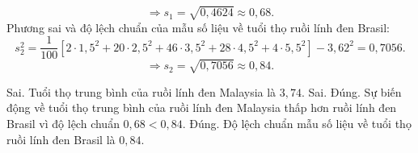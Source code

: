 \begin{ex}
{		$$\Rightarrow s_1 = \sqrt{0{,}4624} \approx 0{,}68.$$
		Phương sai và độ lệch chuẩn của mẫu số liệu về tuổi thọ ruồi lính đen Brasil:
		$$s_{2}^{2} = \dfrac{1}{100}\left[2 \cdot 1{,}5^2 + 20 \cdot 2{,}5^2 + 46 \cdot 3{,}5^2 + 28 \cdot 4{,}5^2 + 4 \cdot 5{,}5^2 \right] - 3{,}62^{2} = 0{,}7056.$$
		$$\Rightarrow s_2 = \sqrt{0{,}7056} \approx 0{,}84.$$
		\begin{itemchoice}
			\itemch Sai. Tuổi thọ trung bình của ruồi lính đen Malaysia là $3{,}74$.
			\itemch Sai.
			\itemch Đúng. Sự biến động về tuổi thọ trung bình của ruồi lính đen Malaysia thấp hơn ruồi lính đen Brasil vì độ lệch chuẩn $0{,}68 < 0{,}84$.
			\itemch Đúng. Độ lệch chuẩn mẫu số liệu về tuổi thọ ruồi lính đen Brasil là $0{,}84$.
		\end{itemchoice}
	}
\end{ex}

